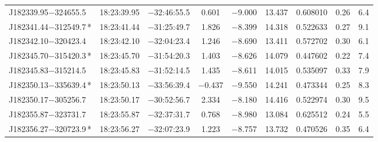 \begin{table*}
\begin{tabular}{lcccccccr}
J182339.95$-$324655.5 & 18:23:39.95 & $-$32:46:55.5 &  0.601 & $-$9.000 & 13.437 & 0.608010 & 0.26 & 6.4 \\
J182341.44$-$312549.7\,* & 18:23:41.44 & $-$31:25:49.7 &  1.826 & $-$8.399 & 14.318 & 0.522633 & 0.27 & 9.1 \\
J182342.10$-$320423.4 & 18:23:42.10 & $-$32:04:23.4 &  1.246 & $-$8.690 & 13.411 & 0.572702 & 0.30 & 6.1 \\
J182345.70$-$315420.3\,* & 18:23:45.70 & $-$31:54:20.3 &  1.403 & $-$8.626 & 14.079 & 0.447602 & 0.22 & 7.4 \\
J182345.83$-$315214.5 & 18:23:45.83 & $-$31:52:14.5 &  1.435 & $-$8.611 & 14.015 & 0.535097 & 0.33 & 7.9 \\
J182350.13$-$335639.4\,* & 18:23:50.13 & $-$33:56:39.4 & $-$0.437 & $-$9.550 & 14.241 & 0.473344 & 0.25 & 8.3 \\
J182350.17$-$305256.7 & 18:23:50.17 & $-$30:52:56.7 &  2.334 & $-$8.180 & 14.416 & 0.522974 & 0.30 & 9.5 \\
J182355.87$-$323731.7 & 18:23:55.87 & $-$32:37:31.7 &  0.768 & $-$8.980 & 13.084 & 0.625512 & 0.24 & 5.5 \\
J182356.27$-$320723.9\,* & 18:23:56.27 & $-$32:07:23.9 &  1.223 & $-$8.757 & 13.732 & 0.470526 & 0.35 & 6.4 \\
\hline
\end{tabular}
\end{table*}

\addtocounter{table}{-1}


